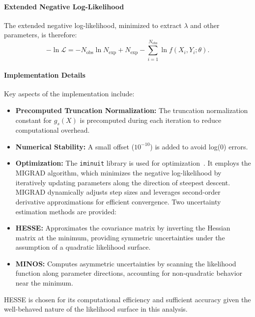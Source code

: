 \documentclass[11pt, a4paper]{article}
\begin{document}
\paragraph{Extended Negative Log-Likelihood}
The extended negative log-likelihood, minimized to extract \(\lambda\) and other parameters, is therefore:
\begin{equation}
    -\ln \mathcal{L} = -N_{\text{obs}} \ln N_{\text{exp}} + N_{\text{exp}} - \sum_{i=1}^{N_{\text{obs}}} \ln f(X_i, Y_i; \theta).
    \label{eq:neg_log_likelihood}
\end{equation}

\paragraph{Implementation Details}
Key aspects of the implementation include:
\begin{itemize}
    \item \textbf{Precomputed Truncation Normalization:} The truncation normalization constant for \( g_s(X) \) is precomputed during each iteration to reduce computational overhead.
    \item \textbf{Numerical Stability:} A small offset (\( 10^{-10} \)) is added to avoid log(0) errors.

\end{itemize}

\begin{itemize}
\item \textbf{Optimization:} The \texttt{iminuit} library is used for optimization~\cite{dembinski2021iminuit}. It employs the MIGRAD algorithm, which minimizes the negative log-likelihood by iteratively updating parameters along the direction of steepest descent. MIGRAD dynamically adjusts step sizes and leverages second-order derivative approximations for efficient convergence. Two uncertainty estimation methods are provided:
\end{itemize}

\begin{itemize}
    \item \textbf{HESSE:} Approximates the covariance matrix by inverting the Hessian matrix at the minimum, providing symmetric uncertainties under the assumption of a quadratic likelihood surface.
    \item \textbf{MINOS:} Computes asymmetric uncertainties by scanning the likelihood function along parameter directions, accounting for non-quadratic behavior near the minimum.
\end{itemize}
HESSE is chosen for its computational efficiency and sufficient accuracy given the well-behaved nature of the likelihood surface in this analysis.
\end{document}
